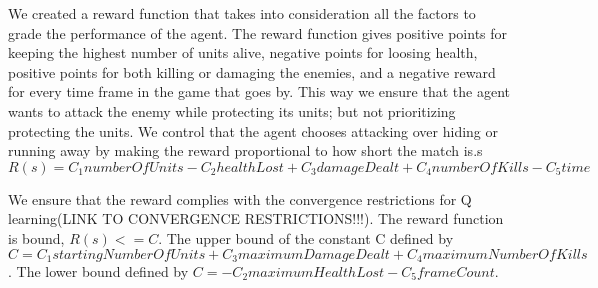 We created a reward function that takes into consideration all the factors to grade the performance of the agent. The reward function gives positive points for keeping the highest number of units alive, negative points for loosing health, positive points for both killing or damaging the enemies, and a negative reward for every time frame in the game that goes by. This way we ensure that the agent wants to attack the enemy while protecting its units; but not prioritizing protecting the units. We control that the agent chooses attacking over hiding or running away by making the reward proportional to how short the match is.s
\begin{equation}
R(s) = C_1 numberOfUnits  -  C_2 healthLost  +   C_3 damageDealt  +   C_4 numberOfKills -  C_5 time
\end{equation}

We ensure that the reward complies with the convergence restrictions for Q learning(LINK TO CONVERGENCE RESTRICTIONS!!!). The reward function is bound, $R(s) <= C$. The upper bound of the constant C defined by $C = C_1 startingNumberOfUnits  +   C_3 maximumDamageDealt  +   C_4 maximumNumberOfKills$. The lower bound defined by $C = -  C_2 maximumHealthLost -  C_5 frameCount$. 

